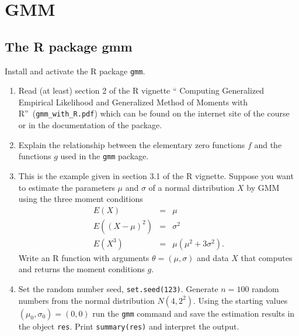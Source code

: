 \documentclass{article}
\begin{document}
\newpage
\section{GMM\label{GMM}}

\subsection{The R package gmm}

Install and activate the R package \texttt{gmm}.

\begin{enumerate}
\item Read (at least) section 2 of the R vignette \textquotedblleft
Computing Generalized Empirical Likelihood and Generalized Method of Moments
with R\textquotedblright\ (\texttt{gmm\_with\_R.pdf}) which can be found on
the internet site of the course or in the documentation of the package.

\item Explain the relationship between the elementary zero functions $f$ and
the functions $g$ used in the \texttt{gmm} package.

\item This is the example given in section 3.1 of the R vignette. Suppose
you want to estimate the parameters $\mu $ and $\sigma $ of a normal
distribution $X$ by GMM using the three moment conditions%
\begin{eqnarray*}
E(X) &=&\mu \\
E(\left( X-\mu \right) ^{2}) &=&\sigma ^{2} \\
E(X^{3}) &=&\mu \left( \mu ^{2}+3\sigma ^{2}\right) .
\end{eqnarray*}%
Write an R function with arguments $\theta =(\mu ,\sigma )$ and data $X$
that computes and returns the moment conditions $g$.

\item Set the random number seed, \texttt{set.seed(123)}. Generate $n=100$
random numbers from the normal distribution $N(4,2^{2})$. Using the starting
values $\left( \mu _{0},\sigma _{0}\right) =(0,0)$ run the \texttt{gmm}
command and save the estimation results in the object \texttt{res}. Print
\texttt{summary(res)} and interpret the output.
\end{enumerate}
\end{document}
